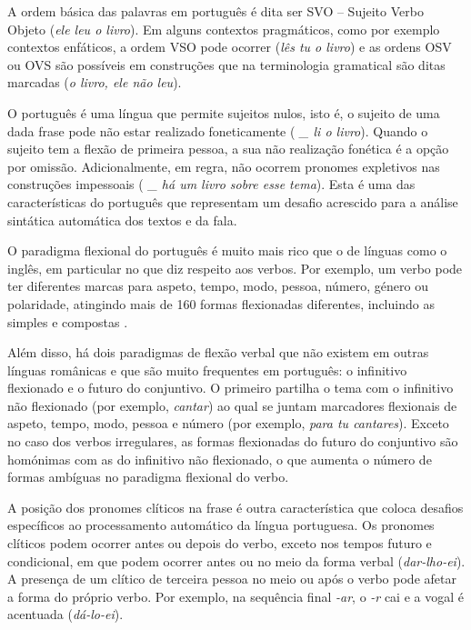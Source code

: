 \begin{multicols}{2}

A ordem básica das palavras em português é dita ser SVO --  Sujeito Verbo Objeto (\textit{ele leu o livro}). 
Em alguns contextos pragmáticos, como por exemplo contextos enfáticos, a ordem VSO pode ocorrer (\textit{lês tu o livro}) 
e as ordens OSV ou OVS são possíveis em construções que na terminologia gramatical são ditas marcadas (\textit{o livro, ele não leu}).

O português é uma língua que permite sujeitos nulos, isto é, o sujeito de uma dada frase pode não estar realizado foneticamente (\textit{ \_ li o livro}). 
Quando o sujeito tem a flexão de primeira pessoa, a sua não realização fonética é a opção por omissão. 
Adicionalmente, em regra, não ocorrem pronomes expletivos
nas construções impessoais (\textit{ \_ há um livro sobre esse tema}). 
Esta é uma das características do português que representam um desafio acrescido para a análise sintática automática dos textos e da fala.

O paradigma flexional do português é muito mais rico que o de línguas como o inglês, em particular no que diz respeito aos verbos.
Por exemplo, um verbo pode ter diferentes marcas para aspeto, tempo, modo, pessoa, número, género ou polaridade,
atingindo mais de 160 formas flexionadas diferentes, incluindo as simples e compostas \cite{branco}.


Além disso, há dois paradigmas de flexão verbal que não existem em outras línguas românicas e que são muito frequentes em português: o infinitivo flexionado e o futuro do conjuntivo. O primeiro partilha o tema com o infinitivo não flexionado (por exemplo, \textit{cantar}) ao qual se juntam marcadores flexionais
de aspeto, tempo, modo, pessoa e número (por exemplo, \textit{para tu cantares}).
Exceto no caso dos verbos irregulares, as formas flexionadas do futuro do conjuntivo são homónimas com as do infinitivo não flexionado,  
o que aumenta o número de formas ambíguas no paradigma flexional do verbo.

A posição dos pronomes clíticos na frase é outra ca\-rac\-te\-rís\-ti\-ca que coloca desafios específicos ao processamento 
automático da língua portuguesa. Os pronomes clíticos podem ocorrer antes ou depois do verbo, exceto nos tempos futuro e condicional, 
em que podem ocorrer antes ou no meio da forma verbal (\textit{dar-lho-ei}). 
A presença de um clítico de terceira pessoa no meio ou após o verbo pode afetar a forma do próprio verbo.
Por exemplo, na sequência final \textit{-ar}, o \textit{-r} cai e a vogal é acentuada (\textit{dá-lo-ei}).




\end{multicols}
